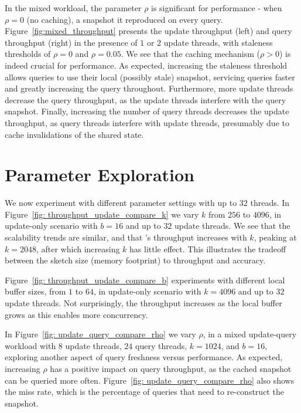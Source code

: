 In the mixed workload, the parameter $\rho$ is significant for performance - when $\rho = 0$ (no caching), a snapshot it reproduced on every query.
Figure~\ref{fig:mixed_throughput} presents the update throughput (left) and query throughput (right) in the presence of $1$ or $2$ update threads, with staleness thresholds of $\rho=0$ and $\rho=0.05$. We see that the caching mechanism ($\rho > 0$) is indeed crucial for performance. As expected, increasing the staleness threshold allows queries to use their local (possibly stale) snapshot, servicing queries faster and greatly increasing the query throughout. Furthermore, more update threads decrease the query throughput, as the update threads interfere with the query snapshot. 
Finally, increasing the number of query threads decreases the update throughput, as query threads interfere with update threads, presumably due to cache invalidations of the shared state.


\section{Parameter Exploration}
\label{sec:params} 
We now experiment with different parameter settings with up to $32$ threads. 
In  Figure~\ref{fig: throughput_update_compare_k} we vary $k$ from $256$ to $4096$, in update-only scenario with $b = 16$ and up to $32$ update threads.
We see that the scalability trends are similar, and that \mysketch's throughput increases with $k$, peaking at $k = 2048$, after which increasing $k$ has little effect.
This illustrates the tradeoff between the sketch size (memory footprint) to  throughput and accuracy. 


Figure~\ref{fig: throughput_update_compare_b} experiments with different local buffer sizes, from $1$ to $64$, in update-only scenario with $k = 4096$ and up to $32$ update threads. Not surprisingly, the throughput increases as the local buffer grows as this enables more concurrency. 


In Figure~\ref{fig: update_query_compare_rho} we vary $\rho$, in a mixed update-query workload with $8$ update threads, $24$ query threads, $k = 1024$, and $b = 16$, exploring another aspect of query freshness versus performance. As expected, increasing  $\rho$ has a positive impact on query throughput, as the cached snapshot can be queried more often.  Figure~\ref{fig: update_query_compare_rho} also shows the miss rate, which is the percentage of queries that need to re-construct the snapshot.


